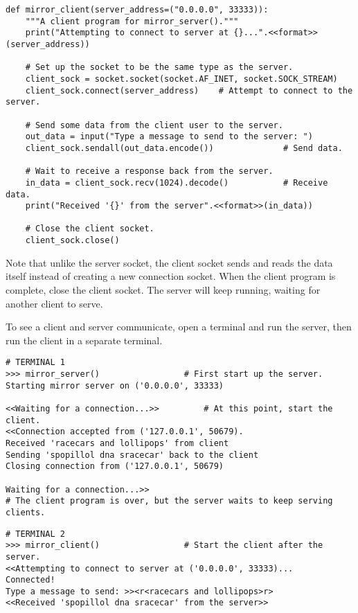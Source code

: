 \begin{lstlisting}
def mirror_client(server_address=("0.0.0.0", 33333)):
    """A client program for mirror_server()."""
    print("Attempting to connect to server at {}...".<<format>>(server_address))

    # Set up the socket to be the same type as the server.
    client_sock = socket.socket(socket.AF_INET, socket.SOCK_STREAM)
    client_sock.connect(server_address)    # Attempt to connect to the server.

    # Send some data from the client user to the server.
    out_data = input("Type a message to send to the server: ")
    client_sock.sendall(out_data.encode())              # Send data.

    # Wait to receive a response back from the server.
    in_data = client_sock.recv(1024).decode()           # Receive data.
    print("Received '{}' from the server".<<format>>(in_data))

    # Close the client socket.
    client_sock.close()
\end{lstlisting}

Note that unlike the server socket, the client socket sends and reads the data itself instead of creating a new connection socket.
When the client program is complete, close the client socket.
The server will keep running, waiting for another client to serve.

To see a client and server communicate, open a terminal and run the server, then run the client in a separate terminal.

\begin{lstlisting}
# TERMINAL 1
>>> mirror_server()                 # First start up the server.
Starting mirror server on ('0.0.0.0', 33333)

<<Waiting for a connection...>>         # At this point, start the client.
<<Connection accepted from ('127.0.0.1', 50679).
Received 'racecars and lollipops' from client
Sending 'spopillol dna sracecar' back to the client
Closing connection from ('127.0.0.1', 50679)

Waiting for a connection...>>
# The client program is over, but the server waits to keep serving clients.
\end{lstlisting}

\begin{lstlisting}
# TERMINAL 2
>>> mirror_client()                 # Start the client after the server.
<<Attempting to connect to server at ('0.0.0.0', 33333)...
Connected!
Type a message to send: >><r<racecars and lollipops>r>
<<Received 'spopillol dna sracecar' from the server>>
\end{lstlisting}

